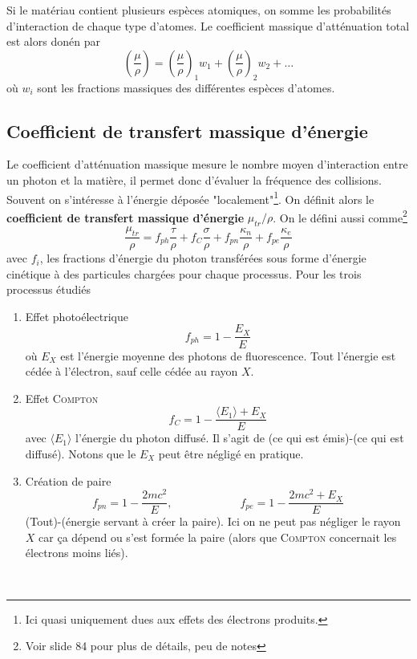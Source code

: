 \newpage
Si le matériau contient plusieurs espèces atomiques, on somme les probabilités d'interaction 
de chaque type d'atomes. Le coefficient massique d'atténuation total est alors donén par
\begin{equation}
\left(\frac{\mu}{\rho}\right)=\left(\frac{\mu}{\rho}\right)_1w_1+\left(\frac{\mu}{\rho}\right)_2w_2+
\dots
\end{equation}
où $w_i$ sont les fractions massiques des différentes espèces d'atomes.

\subsection{Coefficient de transfert massique d'énergie}%
Le coefficient d'atténuation massique mesure le nombre moyen d'interaction entre un photon 
et la matière, il permet donc d'évaluer la fréquence des collisions. Souvent on s'intéresse
à l'énergie déposée "localement"\footnote{Ici quasi uniquement dues aux effets des électrons 
produits.}. On définit alors le \textbf{coefficient de transfert massique d'énergie} $\mu_{tr}/\rho$.
On le défini aussi comme\footnote{Voir slide 84 pour plus de détails, peu de notes}
\begin{equation}
\frac{\mu_{tr}}{\rho}=f_{ph}\frac{\tau}{\rho}+f_{C}\frac{\sigma}{\rho}+f_{pn}\frac{\kappa_n}{\rho}+f_{pe}\frac{\kappa_e}{\rho}
\end{equation}
avec $f_i$, les fractions d'énergie du photon transférées sous forme d'énergie cinétique à des
particules chargées pour chaque processus. Pour les trois processus étudiés
\begin{enumerate}
\item Effet photoélectrique
\begin{equation}
f_{ph}=1-\frac{E_X}{E}
\end{equation}
où $E_X$ est l'énergie moyenne des photons de fluorescence. Tout l'énergie est cédée à l'électron, 
sauf celle cédée au rayon $X$.
\item Effet \textsc{Compton}
\begin{equation}
f_{C}=1-\frac{\langle E_1 \rangle +E_X}{E}
\end{equation}
avec $\langle E_1\rangle$ l'énergie du photon diffusé. Il s'agit de (ce qui est émis)-(ce qui est
diffusé). Notons que le $E_X$ peut être négligé en pratique. 
\item Création de paire
\begin{equation}
f_{pn}=1-\frac{2mc^2}{E},\qquad\qquad\qquad f_{pe}=1-\frac{2mc^2+E_X}{E}
\end{equation}
(Tout)-(énergie servant à créer la paire). Ici on ne peut pas négliger le rayon $X$ car ça dépend
ou s'est formée la paire (alors que \textsc{Compton} concernait les électrons moins liés).
\end{enumerate}\ \\

